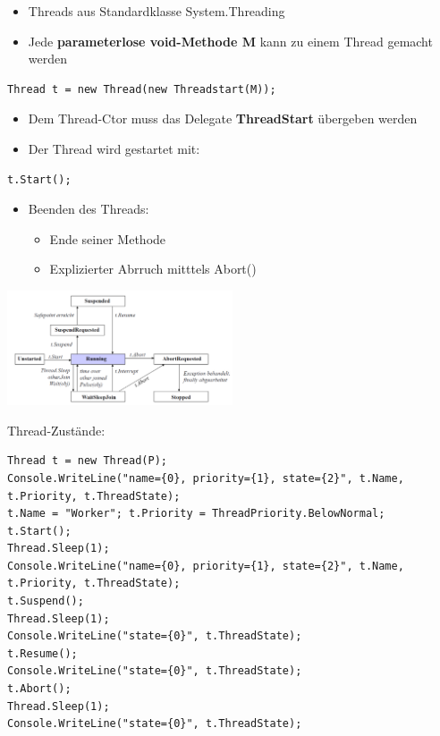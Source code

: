 \begin{itemize}
  \item Threads aus Standardklasse System.Threading
  \item Jede \textbf{parameterlose void-Methode M} kann zu einem Thread gemacht
  werden 
\end{itemize}
\begin{centering}
  \begin{lstlisting}[style=C]
  Thread t = new Thread(new Threadstart(M));
  \end{lstlisting}
\end{centering}
\begin{itemize}
  \item Dem Thread-Ctor muss das Delegate \textbf{ThreadStart} übergeben werden
  \item Der Thread wird gestartet mit:  
\end{itemize}
\begin{centering}
  \begin{lstlisting}[style=C]
  t.Start();
  \end{lstlisting}
\end{centering}
\begin{itemize}
  \item Beenden des Threads: 
  \begin{itemize}
    \item Ende seiner Methode
    \item Explizierter Abrruch mitttels Abort()  
  \end{itemize} 
\end{itemize}
\begin{center}
{\includegraphics[width=0.5\textwidth]{images/Concurrency/Zustandsuebergaenge.png}}
\end{center}

Thread-Zustände:
\begin{lstlisting}[style=CSharp]
Thread t = new Thread(P);
Console.WriteLine("name={0}, priority={1}, state={2}", t.Name, t.Priority, t.ThreadState);
t.Name = "Worker"; t.Priority = ThreadPriority.BelowNormal;
t.Start();
Thread.Sleep(1);
Console.WriteLine("name={0}, priority={1}, state={2}", t.Name, t.Priority, t.ThreadState);
t.Suspend();
Thread.Sleep(1);
Console.WriteLine("state={0}", t.ThreadState);
t.Resume();
Console.WriteLine("state={0}", t.ThreadState);
t.Abort();
Thread.Sleep(1);
Console.WriteLine("state={0}", t.ThreadState);
\end{lstlisting}



